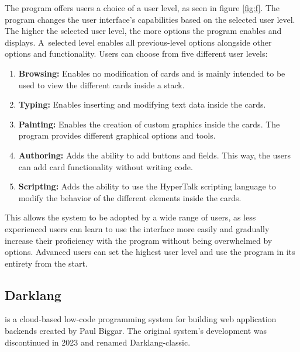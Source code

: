 The program offers users a choice of a user level, as seen in figure \ref{fig:f}. The program changes the user interface's capabilities based on the selected user level.
The higher the selected user level, the more options the program enables and displays. A~selected level enables all previous-level options alongside other options and functionality.
Users can choose from five different user levels:
\begin{enumerate}
	\item \textbf{Browsing:} Enables no modification of cards and is mainly intended to be used to view the different cards inside a stack.
	\item \textbf{Typing:} Enables inserting and modifying text data inside the cards.
	\item \textbf{Painting:} Enables the creation of custom graphics inside the cards. The program provides different graphical options and tools.
	\item \textbf{Authoring:} Adds the ability to add buttons and fields. This way, the users can add card functionality without writing code.
	\item \textbf{Scripting:} Adds the ability to use the HyperTalk scripting language to modify the behavior of the different elements inside the cards.
\end{enumerate}
This allows the system to be adopted by a wide range of users, as less experienced users can learn to use the interface more easily and gradually increase their proficiency with the program without being overwhelmed by options.
Advanced users can set the highest user level and use the program in its entirety from the start.

\subsection{Darklang}
\label{sec:darklang}
\citet{darklang} is a cloud-based low-code programming system for building web application backends created by Paul Biggar.
The original system's development was discontinued in 2023 and renamed Darklang-classic.

